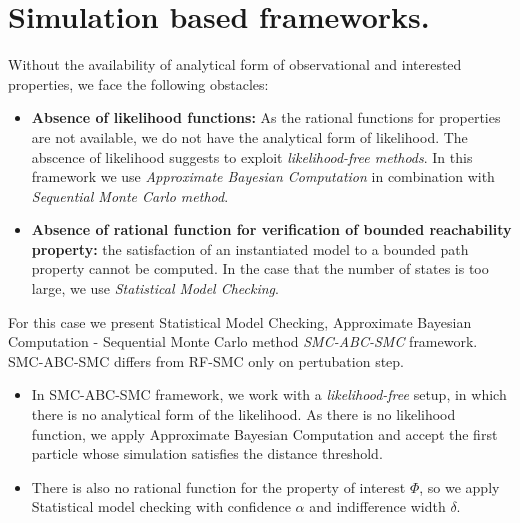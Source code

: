 \section{Simulation based frameworks.}
Without the availability of analytical form of observational and interested properties, we face the
following obstacles:
\begin{itemize}
      \item \textbf{Absence of likelihood functions:} As the rational functions for properties are
            not available, we do not have the analytical form of likelihood. The abscence of
            likelihood suggests to exploit \textit{likelihood-free methods}. In this framework we
            use \textit{Approximate Bayesian Computation} in combination with \textit{Sequential
                  Monte Carlo method}.
      \item \textbf{Absence of rational function for verification of bounded reachability property:}
            the satisfaction of an instantiated model to a bounded path property cannot be computed.
            In the case that the number of states is too large, we use \textit{Statistical Model
                  Checking}.
\end{itemize}
For this case we present Statistical Model Checking, Approximate Bayesian Computation - Sequential
Monte Carlo method \textit{SMC-ABC-SMC} framework. SMC-ABC-SMC differs from RF-SMC only on
pertubation step.
\begin{itemize}
      \item In SMC-ABC-SMC framework, we work with a \textit{likelihood-free} setup, in which
            there is no analytical form of the likelihood. As there is no likelihood function, we apply
            Approximate Bayesian Computation and  accept the first particle whose simulation satisfies the
            distance threshold.
      \item There is also no rational function for the property
            of interest $\Phi$, so we apply Statistical model checking with confidence $\alpha$ and indifference
            width $\delta$.
\end{itemize}

